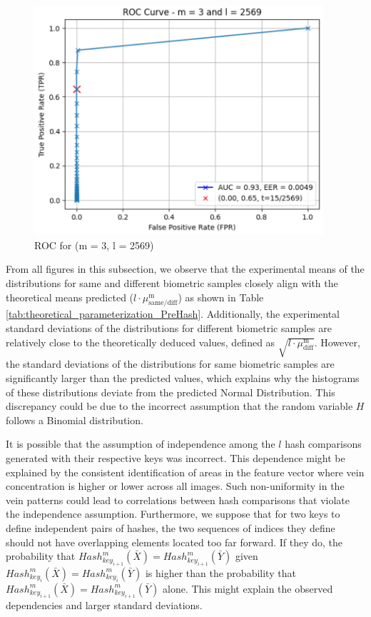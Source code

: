 \begin{enumerate}
\begin{itemize}
            \begin{figure}[H]
                    \centering
                    \includegraphics[width=\linewidth,height=8.5cm,keepaspectratio]{latex-img/FNR-FPR_ROC_TPR_config3.png}
                    \caption{ROC for (m = 3, l = 2569)}
                    \label{FNR-FPR_ROC_TPR_config3}
            \end{figure}
        \end{itemize}
\end{enumerate}

From all figures in this subsection, we observe that the experimental means of the distributions for same and different biometric samples closely align with the theoretical means predicted (\(l\cdot\mu_{\text{same/diff}}^\text{m}\)) as shown in Table \ref{tab:theoretical_parameterization_PreHash}. Additionally, the experimental standard deviations of the distributions for different biometric samples are relatively close to the theoretically deduced values, defined as \(\sqrt{l\cdot\mu_{\text{diff}}^\text{m}}\). However, the standard deviations of the distributions for same biometric samples are significantly larger than the predicted values, which explains why the histograms of these distributions deviate from the predicted Normal Distribution. This discrepancy could be due to the incorrect assumption that the random variable \(H\) follows a Binomial distribution. 

It is possible that the assumption of independence among the \(l\) hash comparisons generated with their respective keys was incorrect. This dependence might be explained by the consistent identification of areas in the feature vector where vein concentration is higher or lower across all images. Such non-uniformity in the vein patterns could lead to correlations between hash comparisons that violate the independence assumption. Furthermore, we suppose that for two keys to define independent pairs of hashes, the two sequences of indices they define should not have overlapping elements located too far forward. If they do, the probability that \( Hash_{key_{i+1}}^m(\bar{X}) = Hash_{key_{i+1}}^m(\bar{Y}) \) given \( Hash_{key_{i}}^m(\bar{X}) = Hash_{key_{i}}^m(\bar{Y}) \) is higher than the probability that \( Hash_{key_{i+1}}^m(\bar{X}) = Hash_{key_{i+1}}^m(\bar{Y}) \)
alone. This might explain the observed dependencies and larger standard deviations.

